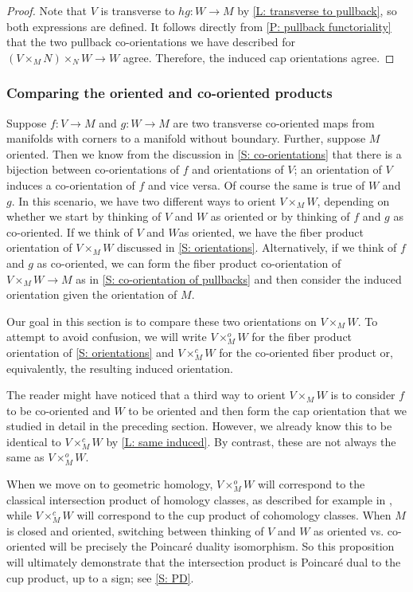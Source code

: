 \begin{proof}
	Note that $V$ is transverse to $hg \colon W \to M$ by \cref{L: transverse to pullback}, so both expressions are defined.
	It follows directly from \cref{P: pullback functoriality} that the two pullback co-orientations we have described for $(V \times_M N) \times_N W \to W$ agree.
	Therefore, the induced cap orientations agree.
\end{proof}

\subsubsection{Comparing the oriented and co-oriented products}

Suppose $f \colon V \to M$ and $g \colon W \to M$ are two transverse co-oriented maps from manifolds with corners to a manifold without boundary.
Further, suppose $M$ oriented.
Then we know from the discussion in \cref{S: co-orientations} that there is a bijection between co-orientations of $f$ and orientations of $V$; an orientation of $V$ induces a co-orientation of $f$ and vice versa.
Of course the same is true of $W$ and $g$.
In this scenario, we have two different ways to orient $V \times_M W$, depending on whether we start by thinking of $V$ and $W$ as oriented or by thinking of $f$ and $g$ as co-oriented.
If we think of $V$ and $W $as oriented, we have the fiber product orientation of $V \times_M W$
discussed in \cref{S: orientations}.
Alternatively, if we think of $f$ and $g$ as co-oriented, we can form the fiber product co-orientation of $V \times_M W \to M$ as in \cref{S: co-orientation of pullbacks} and then consider the induced orientation given the orientation of $M$.

Our goal in this section is to compare these two orientations on $V \times_M W$.
To attempt to avoid confusion, we will write $V \times_M ^oW$ for the fiber product orientation of \cref{S: orientations} and $V \times_M ^cW$ for the co-oriented fiber product or, equivalently, the resulting induced orientation.

The reader might have noticed that a third way to orient $V \times_M W$ is to consider $f$ to be co-oriented and $W$ to be oriented and then form the cap orientation that we studied in detail in the preceding section.
However, we already know this to be identical to $V \times_M ^cW$ by \cref{L: same induced}.
By contrast, these are not always the same as $V \times_M ^oW$.

When we move on to geometric homology, $V \times_M ^oW$ will correspond to the classical intersection product of homology classes, as described for example in \cite[Section VI.11]{Bred97}, while $V \times_M ^cW$ will correspond to the cup product of cohomology classes.
When $M$ is closed and oriented, switching between thinking of $V$ and $W$ as oriented vs. co-oriented will be precisely the Poincar\'e duality isomorphism.
So this proposition will ultimately demonstrate that the intersection product is Poincar\'e dual to the cup product, up to a sign; see \cref{S: PD}.

